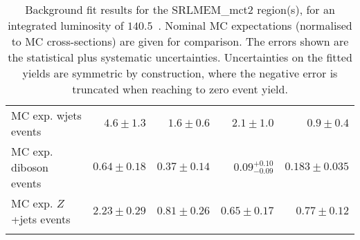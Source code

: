 \begin{table}
\begin{center}
{\begin{tabular*}{\textwidth}{@{\extracolsep{\fill}}lrrrr}
        MC exp. wjets events         & $4.6 \pm 1.3$          & $1.6 \pm 0.6$          & $2.1 \pm 1.0$          & $0.9 \pm 0.4$              \\
        MC exp. diboson events         & $0.64 \pm 0.18$          & $0.37 \pm 0.14$          & $0.09_{-0.09}^{+0.10}$          & $0.183 \pm 0.035$              \\
        MC exp. $Z$+jets events         & $2.23 \pm 0.29$          & $0.81 \pm 0.26$          & $0.65 \pm 0.17$          & $0.77 \pm 0.12$              \\
\noalign{\smallskip}\hline\noalign{\smallskip}
\end{tabular*}
}
\end{center}
\caption{ Background fit results for the SRLMEM\_mct2 region(s),  for an integrated luminosity of $140.5$~\ifb.
Nominal MC expectations (normalised to MC cross-sections) are given for comparison. 
The errors shown are the statistical plus systematic uncertainties.
Uncertainties on the fitted yields are symmetric by construction, 
where the negative error is truncated when reaching to zero event yield.
}
\label{table.results.yields.fit.SRLMEM}
\end{table}
%